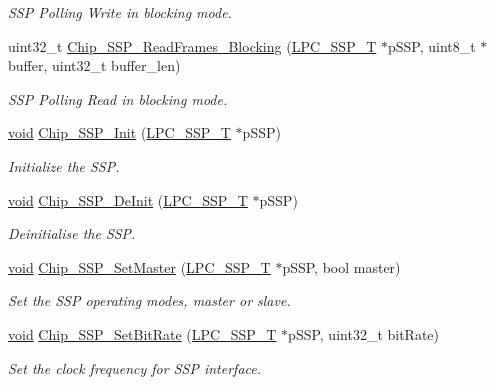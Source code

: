 \begin{DoxyCompactItemize}
\begin{DoxyCompactList}\small\item\em S\-S\-P Polling Write in blocking mode. \end{DoxyCompactList}\item 
uint32\-\_\-t \hyperlink{group__SSP__17XX__40XX_ga8332233bb63af754bd9cc369f2a1e2d6}{Chip\-\_\-\-S\-S\-P\-\_\-\-Read\-Frames\-\_\-\-Blocking} (\hyperlink{structLPC__SSP__T}{L\-P\-C\-\_\-\-S\-S\-P\-\_\-\-T} $\ast$p\-S\-S\-P, uint8\-\_\-t $\ast$buffer, uint32\-\_\-t buffer\-\_\-len)
\begin{DoxyCompactList}\small\item\em S\-S\-P Polling Read in blocking mode. \end{DoxyCompactList}\item 
\hyperlink{Paradigm_2Tern__EE_2small_2portmacro_8h_a14d32f8130d3c0b212cfc751730b5b49}{void} \hyperlink{group__SSP__17XX__40XX_ga66e20405561e8d3dacba65cbfe41d556}{Chip\-\_\-\-S\-S\-P\-\_\-\-Init} (\hyperlink{structLPC__SSP__T}{L\-P\-C\-\_\-\-S\-S\-P\-\_\-\-T} $\ast$p\-S\-S\-P)
\begin{DoxyCompactList}\small\item\em Initialize the S\-S\-P. \end{DoxyCompactList}\item 
\hyperlink{Paradigm_2Tern__EE_2small_2portmacro_8h_a14d32f8130d3c0b212cfc751730b5b49}{void} \hyperlink{group__SSP__17XX__40XX_ga48f87506f2fddc1043606eae292b6f16}{Chip\-\_\-\-S\-S\-P\-\_\-\-De\-Init} (\hyperlink{structLPC__SSP__T}{L\-P\-C\-\_\-\-S\-S\-P\-\_\-\-T} $\ast$p\-S\-S\-P)
\begin{DoxyCompactList}\small\item\em Deinitialise the S\-S\-P. \end{DoxyCompactList}\item 
\hyperlink{Paradigm_2Tern__EE_2small_2portmacro_8h_a14d32f8130d3c0b212cfc751730b5b49}{void} \hyperlink{group__SSP__17XX__40XX_ga60e601329b0aa6afe5f355dc6e8f84bd}{Chip\-\_\-\-S\-S\-P\-\_\-\-Set\-Master} (\hyperlink{structLPC__SSP__T}{L\-P\-C\-\_\-\-S\-S\-P\-\_\-\-T} $\ast$p\-S\-S\-P, bool master)
\begin{DoxyCompactList}\small\item\em Set the S\-S\-P operating modes, master or slave. \end{DoxyCompactList}\item 
\hyperlink{Paradigm_2Tern__EE_2small_2portmacro_8h_a14d32f8130d3c0b212cfc751730b5b49}{void} \hyperlink{group__SSP__17XX__40XX_ga373660d8ad7b28fb71209539b1e72717}{Chip\-\_\-\-S\-S\-P\-\_\-\-Set\-Bit\-Rate} (\hyperlink{structLPC__SSP__T}{L\-P\-C\-\_\-\-S\-S\-P\-\_\-\-T} $\ast$p\-S\-S\-P, uint32\-\_\-t bit\-Rate)
\begin{DoxyCompactList}\small\item\em Set the clock frequency for S\-S\-P interface. \end{DoxyCompactList}\end{DoxyCompactItemize}



